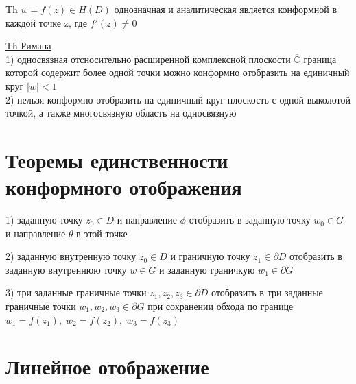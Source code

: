 \documentclass[a4paper]{article}
\begin{document}
\begin{tcolorbox}
    \underline{Th} $ w = f(z) \in H(D) $ однозначная и аналитическая
    является конформной в каждой точке z, где $ f'(z) \neq 0 $ 
\end{tcolorbox}

\begin{tcolorbox}
    \underline{Th Римана} \\
    1) односвязная отсносительно расширенной комплексной плоскости $ \overline{\mathbb{C}} $
    граница которой содержит более одной точки можно конформно отобразить
    на единичный круг $ |w| < 1 $ \\
    2) нельзя конформно отобразить на единичный круг плоскость с одной выколотой
    точкой, а также многосвязную область на односвязную
\end{tcolorbox}

\section*{\centering Теоремы единственности конформного отображения}
\begin{tcolorbox}
    1) заданную точку $ z_0 \in D $ и направление $ \phi $ отобразить в заданную 
    точку $ w_0 \in G $ и направление $ \theta $ в этой точке

    2) заданную внутренную точку $ z_0 \in D $ и граничную точку $ z_1 \in \partial D $ 
    отобразить в заданную внутреннюю точку $ w \in G $ и заданную граничкую
    $ w_1 \in \partial G $ 

    3) три заданные граничные точки $ z_1, z_2, z_3 \in \partial D $ отобразить
    в три заданные граничные точки $ w_1, w_2, w_3 \in \partial G $ при сохранении
    обхода по границе $ w_1 = f(z_1), \; w_2 = f(z_2), \; w_3 = f(z_3) $ 
\end{tcolorbox}

\section*{\centering Линейное отображение}
\end{document}
